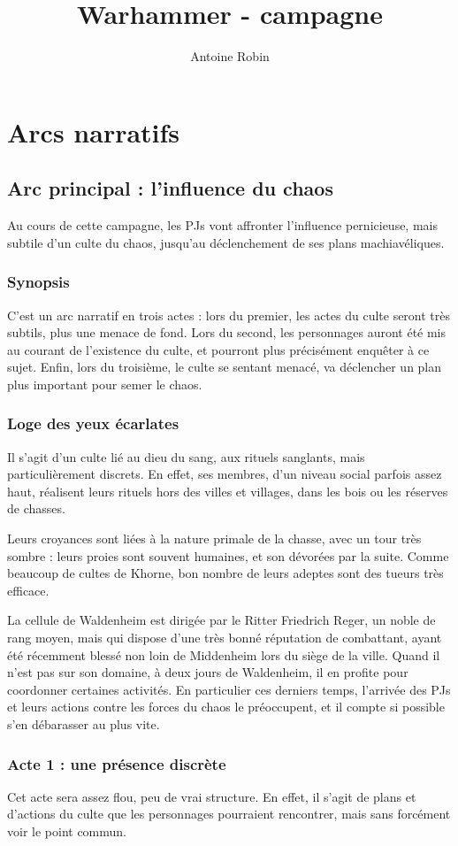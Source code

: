\documentclass[10pt,a4paper]{book}
\author{ Antoine Robin}
\title{Warhammer - campagne}
\newcommand{\nomadversaire}{Loge des yeux écarlates}
\begin{document}
\maketitle
\tableofcontents
\chapter{Arcs narratifs}
\section{Arc principal : l'influence du chaos}
Au cours de cette campagne, les PJs vont affronter l'influence pernicieuse, mais subtile d'un culte du chaos, jusqu'au déclenchement de ses plans machiavéliques.
\subsection{Synopsis}
 C'est un arc narratif en trois actes : lors du premier, les actes du culte seront très subtils, plus une menace de fond. Lors du second, les personnages auront été mis au courant de l'existence du culte, et pourront plus précisément enquêter à ce sujet. Enfin, lors du troisième, le culte se sentant menacé, va déclencher un plan plus important pour semer le chaos.
\subsection{\nomadversaire}
 Il s'agit d'un culte lié au dieu du sang, aux rituels sanglants, mais particulièrement discrets. En effet, ses membres, d'un niveau social parfois assez haut, réalisent leurs rituels hors des villes et villages, dans les bois ou les réserves de chasses.
 
 Leurs croyances sont liées à la nature primale de la chasse, avec un tour très sombre : leurs proies sont souvent humaines, et son dévorées par la suite. Comme beaucoup de cultes de Khorne, bon nombre de leurs adeptes sont des tueurs très efficace. 
 
 La cellule de Waldenheim est dirigée par le Ritter Friedrich Reger, un noble de rang moyen, mais qui dispose d'une très bonné réputation de combattant, ayant été récemment blessé non loin de Middenheim lors du siège de la ville. Quand il n'est pas sur son domaine, à deux jours de Waldenheim, il en profite pour coordonner certaines activités. En particulier ces derniers temps, l'arrivée des PJs et leurs actions contre les forces du chaos le préoccupent, et il compte si possible s'en débarasser au plus vite.
\subsection{Acte 1 : une présence discrète}
Cet acte sera assez flou, peu de vrai structure. En effet, il s'agit de plans et d'actions du culte que les personnages pourraient rencontrer, mais sans forcément voir le point commun.
\end{document}
